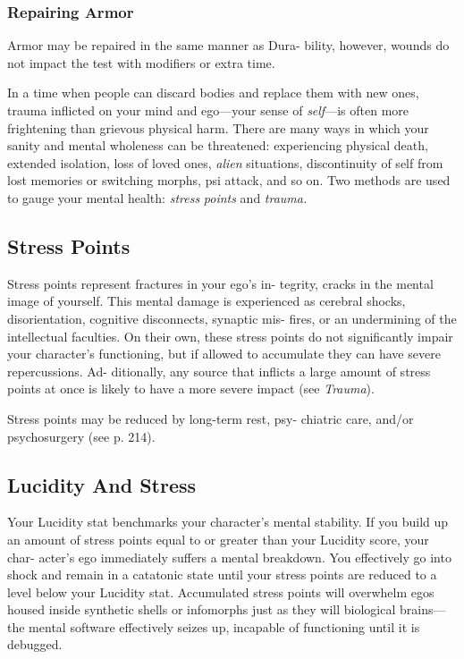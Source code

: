 \subsubsection{Repairing Armor}

Armor may be repaired in the same manner as Dura-
bility, however, wounds do not impact the test with 
modifiers or extra time.

In a time when people can discard bodies and 
replace them with new ones, trauma inflicted  on 
your mind and ego—your sense of \textit{self}—is often 
more frightening than grievous physical harm. There 
are many ways in which your sanity and mental 
wholeness can be threatened: experiencing physical 
death, extended isolation, loss of loved ones, \textit{alien}
situations, discontinuity of self from lost memories 
or switching morphs, psi attack, and so on. Two 
methods are used to gauge your mental health: \textit{stress }
\textit{points} and \textit{trauma.}

\subsection{Stress Points}

Stress points represent fractures in your ego's in-
tegrity, cracks in the mental image of yourself. This 
mental damage is experienced as cerebral shocks, 
disorientation, cognitive disconnects, synaptic mis-
fires, or an undermining of the intellectual faculties. 
On their own, these stress points do not significantly 
impair your character's functioning, but if allowed to 
accumulate they can have severe repercussions. Ad-
ditionally, any source that inflicts a large amount of 
stress points at once is likely to have a more severe 
impact (see \textit{Trauma}).

Stress points may be reduced by long-term rest, psy-
chiatric care, and/or psychosurgery (see p. 214).

\subsection{Lucidity And Stress}

Your Lucidity stat benchmarks your character's mental 
stability. If you build up an amount of stress points 
equal to or greater than your Lucidity score, your char-
acter's ego immediately suffers a mental breakdown. 
You effectively go into shock and remain in a catatonic 
state until your stress points are reduced to a level 
below your Lucidity stat. Accumulated stress points 
will overwhelm egos housed inside synthetic shells or 
infomorphs just as they will biological brains—the 
mental software effectively seizes up, incapable of 
functioning until it is debugged.

